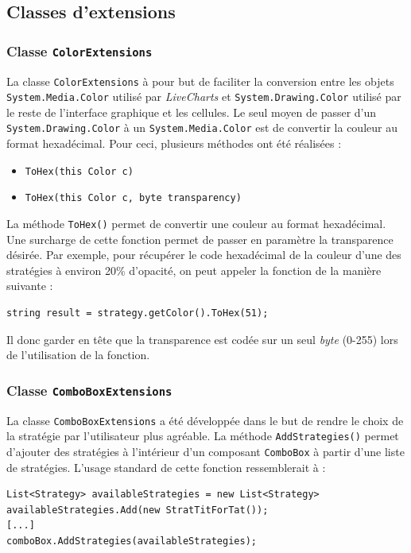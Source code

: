 \documentclass[a4paper, french]{article}
\begin{document}
\pagebreak
\subsection{Classes d'extensions}
\subsubsection{Classe \texttt{ColorExtensions}}
La classe \texttt{ColorExtensions} à pour but de faciliter la conversion entre les objets \texttt{System.Media.Color} utilisé par \textit{LiveCharts} et \texttt{System.Drawing.Color} utilisé par le reste de l'interface graphique et les cellules. Le seul moyen de passer d'un \texttt{System.Drawing.Color} à un \texttt{System.Media.Color} est de convertir la couleur au format hexadécimal. Pour ceci, plusieurs méthodes ont été réalisées : 

\begin{itemize}
    \item \texttt{ToHex(this Color c)}
    \item \texttt{ToHex(this Color c, byte transparency)}
\end{itemize}

La méthode \texttt{ToHex()} permet de convertir une couleur au format hexadécimal. Une surcharge de cette fonction permet de passer en paramètre la transparence désirée. Par exemple, pour récupérer le code hexadécimal de la couleur d'une des stratégies à environ 20\% d'opacité, on peut appeler la fonction de la manière suivante :

\begin{lstlisting}
string result = strategy.getColor().ToHex(51);
\end{lstlisting}

Il donc garder en tête que la transparence est codée sur un seul \textit{byte} (0-255) lors de l'utilisation de la fonction.

\subsubsection{Classe \texttt{ComboBoxExtensions}}
La classe \texttt{ComboBoxExtensions} a été développée dans le but de rendre le choix de la stratégie par l'utilisateur plus agréable. La méthode \texttt{AddStrategies()} permet d'ajouter des stratégies à l'intérieur d'un composant \texttt{ComboBox} à partir d'une liste de stratégies. L'usage standard de cette fonction ressemblerait à :
\begin{lstlisting}
List<Strategy> availableStrategies = new List<Strategy>
availableStrategies.Add(new StratTitForTat());
[...]
comboBox.AddStrategies(availableStrategies);
\end{lstlisting}
\end{document}
